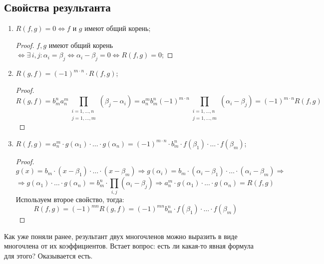 \documentclass[12pt]{article}
\theoremstyle{definition}
\begin{document}
\subsection*{Свойства результанта}
\begin{enumerate}[label=\arabic*)]
	\item $R(f,g) = 0 \Leftrightarrow f$ и $g$ имеют общий корень;
	\begin{proof}
		$f,g$ имеют общий корень $\Leftrightarrow \exists \, i,j \colon \alpha_i = \beta_j \Leftrightarrow \alpha_i - \beta_j = 0 \Leftrightarrow R(f,g) = 0$;
	\end{proof}
	\item $R(g,f) = (-1)^{m {\cdot} n}{\cdot}R(f,g)$;
	\begin{proof}
		$$
			R(g,f) = b_m^na_n^m \prod\limits_{\substack{i =1,\dotsc,n \\ j = 1,\dotsc,m}}( \beta_j - \alpha_i) = a_n^m  b_m^n (-1)^{m {\cdot} n}\prod\limits_{\substack{i =1,\dotsc,n \\ j = 1,\dotsc,m}}( \alpha_i- \beta_j) = (-1)^{m {\cdot} n} R(f,g)
		$$
	\end{proof}
	\item $R(f,g) = a_n^m{\cdot}g(\alpha_1){\cdot}\dotsc{\cdot}g(\alpha_n) = (-1)^{m{\cdot}n}{\cdot}b_m^n{\cdot} f(\beta_1){\cdot}\dotsc{\cdot}f(\beta_m)$;
	\begin{proof}
		$$
			g(x) = b_m{\cdot}(x - \beta_1){\cdot}\dotsc{\cdot}(x - \beta_m) \Rightarrow g(\alpha_i) = b_m{\cdot}(\alpha_i - \beta_1){\cdot}\dotsc{\cdot}(\alpha_i - \beta_m) \Rightarrow
		$$
		$$
			\Rightarrow g(\alpha_1){\cdot}\dotsc{\cdot}g(\alpha_n) = b_m^n{\cdot}\prod\limits_{i,j}( \alpha_i- \beta_j) \Rightarrow a_n^m{\cdot}g(\alpha_1){\cdot}\dotsc{\cdot}g(\alpha_n) = R(f,g)
		$$
		Используем второе свойство, тогда:
		$$
			R(f,g) = (-1)^{mn}R(g,f) = (-1)^{mn}b_m^n{\cdot}f(\beta_1){\cdot}\dotsc{\cdot}f(\beta_m)
		$$
	\end{proof}
\end{enumerate}
Как уже поняли ранее, результант двух многочленов можно выразить в виде многочлена от их коэффициентов. Встает вопрос: есть ли какая-то явная формула для этого? Оказывается есть.
\end{document}
